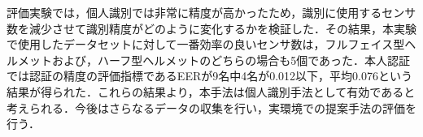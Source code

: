 \documentclass[Japanese,noauthor]{dicomopapers}
\begin{document}
評価実験では，個人識別では非常に精度が高かったため，識別に使用するセンサ数を減少させて識別精度がどのように変化するかを検証した．その結果，本実験で使用したデータセットに対して一番効率の良いセンサ数は，フルフェイス型ヘルメットおよび，ハーフ型ヘルメットのどちらの場合も5個であった．本人認証では認証の精度の評価指標であるEERが9名中4名が0.012以下，平均0.076という結果が得られた．これらの結果より，本手法は個人識別手法として有効であると考えられる．今後はさらなるデータの収集を行い，実環境での提案手法の評価を行う．



\end{document}
